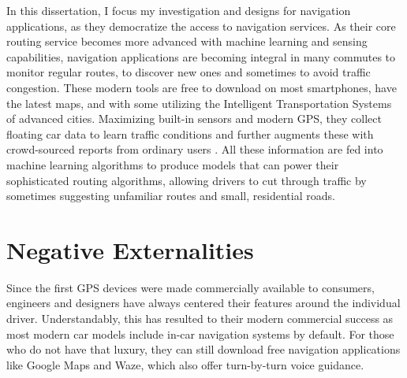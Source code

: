 In this dissertation, I focus my investigation and designs for navigation applications, as they democratize the access to navigation services. As their core routing service becomes more advanced with machine learning and sensing capabilities, navigation applications are becoming integral in many commutes to monitor regular routes, to discover new ones and sometimes to avoid traffic congestion. These modern tools are free to download on most smartphones, have the latest maps, and with some utilizing the Intelligent Transportation Systems of advanced cities. Maximizing built-in sensors and modern GPS, they collect floating car data to learn traffic conditions and further augments these with crowd-sourced reports from ordinary users \cite{Levine2014SystemExchange, Valdes-Dapena2016MostDirections}. All these information are fed into machine learning algorithms to produce models that can power their sophisticated routing algorithms, allowing drivers to cut through traffic by sometimes suggesting unfamiliar routes and small, residential roads. 

\section{Negative Externalities}
Since the first GPS devices were made commercially available to consumers, engineers and designers have always centered their features around the individual driver. Understandably, this has resulted to their modern commercial success as most modern car models include in-car navigation systems by default. For those who do not have that luxury, they can still download free navigation applications like Google Maps and Waze, which also offer turn-by-turn voice guidance. 

